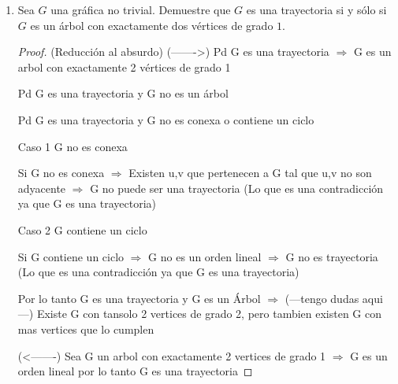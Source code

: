 \documentclass{article}
\begin{document}
\begin{enumerate}
  \item Sea $G$ una gr\'afica no trivial.   Demuestre
    que $G$ es una trayectoria si y s\'olo si $G$ es
    un \'arbol con exactamente dos v\'ertices de
    grado $1$.
    


    \begin{proof} (Reducción al absurdo)
      (------->) Pd G es una trayectoria $\Longrightarrow$ G es un arbol con exactamente 2 vértices de grado 1
      
      Pd G es una trayectoria  y G no es un árbol 
      
      Pd G es una trayectoria  y G no es conexa o contiene un ciclo 
      
      Caso 1 G no es conexa
      
      Si G no es conexa $\Longrightarrow$ Existen  u,v que pertenecen a G tal que u,v no son adyacente $\Longrightarrow$ G no puede ser una trayectoria (Lo que es una contradicción ya que G es una trayectoria)
      
      Caso 2 G contiene un ciclo
      
      Si G contiene un ciclo $\Longrightarrow$  G no es un orden lineal  $\Longrightarrow$ G no es trayectoria (Lo que es una contradicción ya que G es una trayectoria)
      
      Por lo tanto G es una trayectoria y G es un Árbol $\Longrightarrow$ (---tengo dudas aqui---) Existe G con tansolo 2 vertices de grado 2, pero tambien existen G con mas vertices que lo cumplen 
      
      
      (<-------) Sea G un arbol con exactamente 2 vertices de grado 1  $\Longrightarrow$ G es un orden lineal por lo tanto G es una trayectoria
      
      \end{proof}



\end{enumerate}
\end{document}
